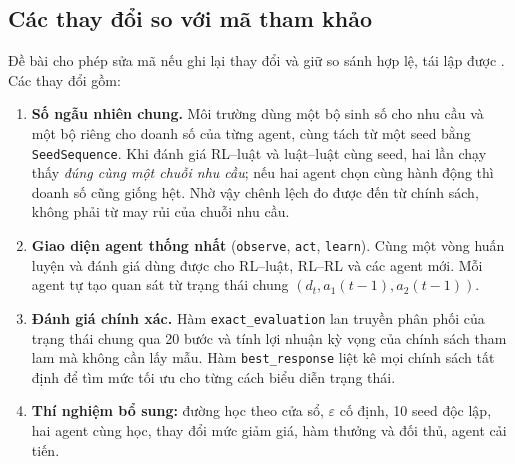 \documentclass[12pt,a4paper]{report}
\begin{document}
\subsection{Các thay đổi so với mã tham khảo}
Đề bài cho phép sửa mã nếu ghi lại thay đổi và giữ so sánh hợp lệ, tái lập được
\cite{assignment}. Các thay đổi gồm:
\begin{enumerate}[label=\textbf{M\arabic*.}]
\item \textbf{Số ngẫu nhiên chung.} Môi trường dùng một bộ sinh số cho nhu cầu và
  một bộ riêng cho doanh số của từng agent, cùng tách từ một seed bằng
  \texttt{SeedSequence}. Khi đánh giá RL--luật và luật--luật cùng seed, hai lần chạy
  thấy \emph{đúng cùng một chuỗi nhu cầu}; nếu hai agent chọn cùng hành động thì
  doanh số cũng giống hệt. Nhờ vậy chênh lệch đo được đến từ chính sách, không
  phải từ may rủi của chuỗi nhu cầu.
\item \textbf{Giao diện agent thống nhất} (\texttt{observe}, \texttt{act},
  \texttt{learn}). Cùng một vòng huấn luyện và đánh giá dùng được cho RL--luật,
  RL--RL và các agent mới. Mỗi agent tự tạo quan sát từ trạng thái chung
  $(d_t,a_1(t-1),a_2(t-1))$.
\item \textbf{Đánh giá chính xác.} Hàm \texttt{exact\_evaluation} lan truyền phân
  phối của trạng thái chung qua 20 bước và tính lợi nhuận kỳ vọng của chính sách
  tham lam mà không cần lấy mẫu. Hàm \texttt{best\_response} liệt kê mọi chính sách
  tất định để tìm mức tối ưu cho từng cách biểu diễn trạng thái.
\item \textbf{Thí nghiệm bổ sung:} đường học theo cửa sổ, $\varepsilon$ cố định,
  10 seed độc lập, hai agent cùng học, thay đổi mức giảm giá, hàm thưởng và đối
  thủ, agent cải tiến.
\end{enumerate}
\end{document}
